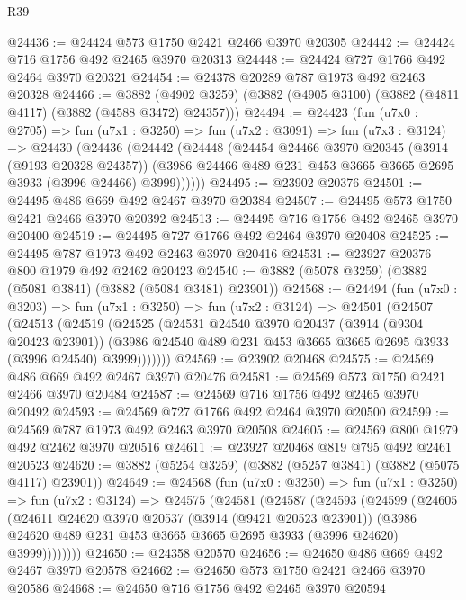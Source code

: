 \begin{lexlean}{R39}
\begin{coremodule}
@24436 := @24424 @573 @1750 @2421 @2466 @3970 @20305
@24442 := @24424 @716 @1756 @492 @2465 @3970 @20313
@24448 := @24424 @727 @1766 @492 @2464 @3970 @20321
@24454 := @24378 @20289 @787 @1973 @492 @2463 @20328
@24466 := @3882
    (@4902 @3259)
    (@3882 (@4905 @3100) (@3882 (@4811 @4117) (@3882 (@4588 @3472) @24357)))
@24494 := @24423
    (fun (u7x0 : @2705) =>
    fun (u7x1 : @3250) =>
    fun (u7x2 : @3091) =>
    fun (u7x3 : @3124) =>
    @24430
      (@24436
        (@24442
          (@24448
            (@24454
              @24466
              @3970
              @20345
              (@3914 (@9193 @20328 @24357))
              (@3986 @24466 @489 @231 @453 @3665 @3665 @2695 @3933 (@3996 @24466) @3999))))))
@24495 := @23902 @20376
@24501 := @24495 @486 @669 @492 @2467 @3970 @20384
@24507 := @24495 @573 @1750 @2421 @2466 @3970 @20392
@24513 := @24495 @716 @1756 @492 @2465 @3970 @20400
@24519 := @24495 @727 @1766 @492 @2464 @3970 @20408
@24525 := @24495 @787 @1973 @492 @2463 @3970 @20416
@24531 := @23927 @20376 @800 @1979 @492 @2462 @20423
@24540 := @3882 (@5078 @3259) (@3882 (@5081 @3841) (@3882 (@5084 @3481) @23901))
@24568 := @24494
    (fun (u7x0 : @3203) =>
    fun (u7x1 : @3250) =>
    fun (u7x2 : @3124) =>
    @24501
      (@24507
        (@24513
          (@24519
            (@24525
              (@24531
                @24540
                @3970
                @20437
                (@3914 (@9304 @20423 @23901))
                (@3986 @24540 @489 @231 @453 @3665 @3665 @2695 @3933 (@3996 @24540) @3999)))))))
@24569 := @23902 @20468
@24575 := @24569 @486 @669 @492 @2467 @3970 @20476
@24581 := @24569 @573 @1750 @2421 @2466 @3970 @20484
@24587 := @24569 @716 @1756 @492 @2465 @3970 @20492
@24593 := @24569 @727 @1766 @492 @2464 @3970 @20500
@24599 := @24569 @787 @1973 @492 @2463 @3970 @20508
@24605 := @24569 @800 @1979 @492 @2462 @3970 @20516
@24611 := @23927 @20468 @819 @795 @492 @2461 @20523
@24620 := @3882 (@5254 @3259) (@3882 (@5257 @3841) (@3882 (@5075 @4117) @23901))
@24649 := @24568
    (fun (u7x0 : @3250) =>
    fun (u7x1 : @3250) =>
    fun (u7x2 : @3124) =>
    @24575
      (@24581
        (@24587
          (@24593
            (@24599
              (@24605
                (@24611
                  @24620
                  @3970
                  @20537
                  (@3914 (@9421 @20523 @23901))
                  (@3986 @24620 @489 @231 @453 @3665 @3665 @2695 @3933 (@3996 @24620) @3999))))))))
@24650 := @24358 @20570
@24656 := @24650 @486 @669 @492 @2467 @3970 @20578
@24662 := @24650 @573 @1750 @2421 @2466 @3970 @20586
@24668 := @24650 @716 @1756 @492 @2465 @3970 @20594

\end{coremodule}
\end{lexlean}
